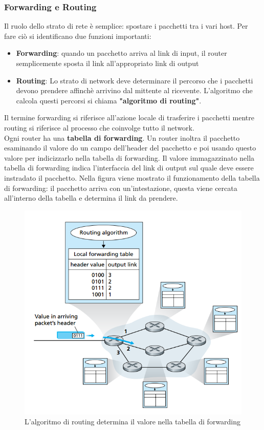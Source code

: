 \documentclass[11pt,a4paper]{article}
\begin{document}
\subsubsection{Forwarding e Routing}
Il ruolo dello strato di rete è semplice: spostare i pacchetti tra i vari host. Per fare ciò si identificano due funzioni importanti:
\begin{itemize}
	\item \textbf{Forwarding}: quando un pacchetto arriva al link di input, il router semplicemente sposta il link all'appropriato link di output
	\item \textbf{Routing}: Lo strato di network deve determinare il percorso che i pacchetti devono prendere affinchè arrivino dal mittente al ricevente. L'algoritmo che calcola questi percorsi si chiama \textbf{"algoritmo di routing"}.
\end{itemize}
Il termine forwarding si riferisce all'azione locale di trasferire i pacchetti mentre routing si riferisce al processo che coinvolge tutto il network. \\
Ogni router ha una \textbf{tabella di forwarding}. Un router inoltra il pacchetto esaminando il valore do un campo dell'header del pacchetto e poi usando questo valore per indicizzarlo nella tabella di forwarding. Il valore immagazzinato nella tabella di forwarding indica l'interfaccia del link di output sul quale deve essere instradato il pacchetto.
Nella figura viene mostrato il funzionamento della tabella di forwarding: il pacchetto arriva con un'intestazione, questa viene cercata all'interno della tabella e determina il link da prendere.
\begin{figure}
	\includegraphics[scale=0.6]{img/050.png}
	\caption{L'algoritmo di routing determina il valore nella tabella di forwarding}
\end{figure}
\end{document}
